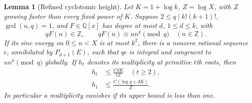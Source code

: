 \documentclass[11pt]{amsart}
\numberwithin{equation}{section}
\newtheorem{lemma}[theorem]{Lemma}
\theoremstyle{remark}
\newcommand{\Z}{\mathbb Z}
\newcommand{\Q}{\mathbb Q}
\begin{document}
\begin{lemma}[Refined cyclotomic height]\label{lem:refined}
Let \(K=1+\log k\), \(Z=\log X\), with \(Z\) growing faster than every
fixed power of \(K\). Suppose \(2\le q\mid k!(k+1)!\), \(\gcd(u,q)=1\),
and \(F\in\Q[x]\) has degree at most \(d\), \(1\le d\le k\), with
\[
 qF(n)\in\Z,\qquad qF(n)\equiv un^k\pmod q\quad(n\in\Z).
\]
If its sine energy on \(0\le n<X\) is at most \(k^2\), there is a
nonzero rational sequence \(\epsilon\), annihilated by \(P_{d+1}(E)\),
such that \(q\epsilon\) is integral and congruent to \(un^k\pmod q\)
globally. If \(h_t\) denotes its multiplicity at primitive \(t\)th
roots, then
\begin{align}
 h_t&\le\frac{CdK}{tZ}\quad(t\ge2),\label{eq:nontrivialheight}\\
 h_1&\le\frac{C(\log q+dK)}Z.\label{eq:oneheight}
\end{align}
In particular a multiplicity vanishes if its upper bound is less than one.
\end{lemma}
\end{document}
